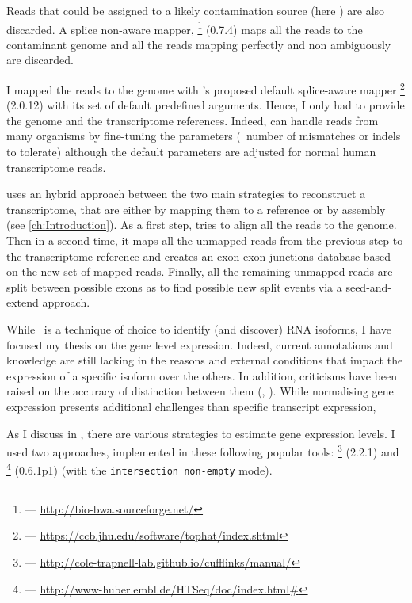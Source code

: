 Reads that could be assigned to a likely contamination source (here
) are also discarded. A splice non-aware mapper,
\footnote{ --- \href{http://bio-bwa.sourceforge.net/}%
{http://bio-bwa.sourceforge.net/}} (0.7.4) maps all the reads to the contaminant
genome and all the reads mapping perfectly and non ambiguously are discarded.

I mapped the reads to the genome with \irap's proposed default splice-aware mapper
\footnote{ ---
\href{https://ccb.jhu.edu/software/tophat/index.shtml}%
{https://ccb.jhu.edu/software/tophat/index.shtml}} (2.0.12) \citep{tophat2}
with its set of default predefined arguments. Hence, I only had to provide the
genome and the transcriptome references. Indeed,  can handle reads
from many organisms by fine-tuning the parameters (\eg\ number of mismatches or
indels to tolerate) although the default parameters are adjusted for normal human
transcriptome reads.

 uses an hybrid approach between the two main
strategies to reconstruct a transcriptome, that are either by mapping them to
a reference or by  assembly (see \cref{ch:Introduction}).
As a first step,  tries to align all the reads
to the genome. Then in a second time, it maps all the unmapped reads from
the previous step to the transcriptome reference and creates an exon-exon
junctions database based on the new set of mapped reads. Finally, all the
remaining unmapped reads are split between possible exons as to find
possible new split events via a seed-and-extend approach.


While \Rnaseq\ is a technique of choice to identify (and discover) \gls{RNA}
isoforms, I have focused my thesis on the gene level expression. Indeed, current
annotations and knowledge are still lacking in the reasons and
external conditions that impact the expression of a specific isoform over the
others. In addition, criticisms have been raised on the accuracy of distinction
between them (\cite{tamaraRNA}, \cite{ernestRNA}). While normalising gene
expression presents additional challenges than specific transcript expression,


As I discuss in , there are various strategies to estimate
gene expression levels. I used two approaches, implemented in these
following popular tools:
\footnote{ ---
\href{http://cole-trapnell-lab.github.io/cufflinks/manual/}%
{http://cole-trapnell-lab.github.io/cufflinks/manual/}} (2.2.1) \citep{cufflinks}
and \footnote{ ---
\href{http://www-huber.embl.de/HTSeq/doc/index.html\#}%
{http://www-huber.embl.de/HTSeq/doc/index.html\#}} (0.6.1p1) (with the
\texttt{intersection non-empty} mode).



